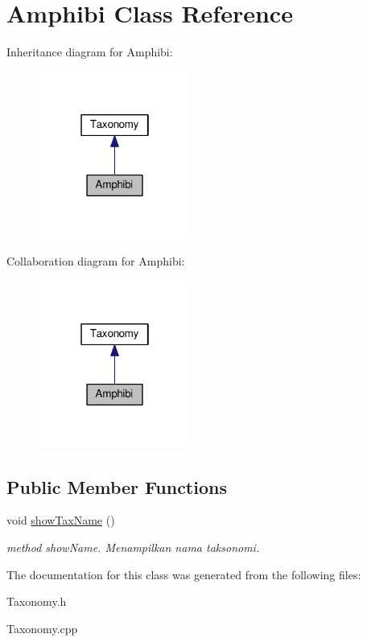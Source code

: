 \hypertarget{classAmphibi}{}\section{Amphibi Class Reference}
\label{classAmphibi}


Inheritance diagram for Amphibi\+:
\nopagebreak
\begin{figure}[H]
\begin{center}
\leavevmode
\includegraphics[width=142pt]{classAmphibi__inherit__graph}
\end{center}
\end{figure}


Collaboration diagram for Amphibi\+:
\nopagebreak
\begin{figure}[H]
\begin{center}
\leavevmode
\includegraphics[width=142pt]{classAmphibi__coll__graph}
\end{center}
\end{figure}
\subsection*{Public Member Functions}
\begin{DoxyCompactItemize}
\item 
void \hyperlink{classAmphibi_aee82336be6761e469bbab4388c806bc3}{show\+Tax\+Name} ()\hypertarget{classAmphibi_aee82336be6761e469bbab4388c806bc3}{}\label{classAmphibi_aee82336be6761e469bbab4388c806bc3}

\begin{DoxyCompactList}\small\item\em method show\+Name. Menampilkan nama taksonomi. \end{DoxyCompactList}\end{DoxyCompactItemize}


The documentation for this class was generated from the following files\+:\begin{DoxyCompactItemize}
\item 
Taxonomy.\+h\item 
Taxonomy.\+cpp\end{DoxyCompactItemize}
